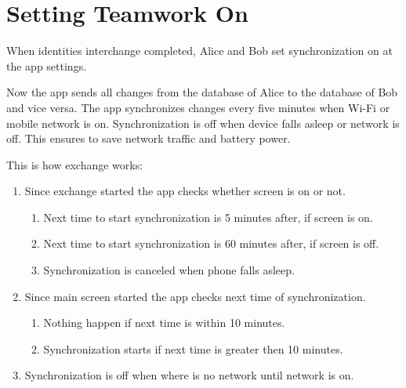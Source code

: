 \documentclass[a4paper,10pt,english]{sphinxmanual}
\begin{document}
\section{Setting Teamwork On}
\label{\detokenize{teamwork:setting-teamwork-on}}
When identities interchange completed, Alice and Bob set synchronization on at the app settings.

\noindent{}

\noindent{}

\noindent{}

\noindent{}

Now the app sends all changes from the database of Alice to the database of Bob and vice versa.
The app synchronizes changes every five minutes when Wi-Fi or mobile network is on. Synchronization
is off when device falls asleep or network is off. This ensures to save network traffic and
battery power.

This is how exchange works:
\begin{enumerate}
\def\theenumi{\arabic{enumi}}
\def\labelenumi{\theenumi .}
\makeatletter\def\p@enumii{\p@enumi \theenumi .}\makeatother
\item {} 
Since exchange started the app checks whether screen is on or not.
\begin{enumerate}
\def\theenumii{\arabic{enumii}}
\def\labelenumii{\theenumii .}
\makeatletter\def\p@enumiii{\p@enumii \theenumii .}\makeatother
\item {} 
Next time to start synchronization is 5 minutes after, if screen is on.

\item {} 
Next time to start synchronization is 60 minutes after, if screen is off.

\item {} 
Synchronization is canceled when phone falls asleep.

\end{enumerate}

\item {} 
Since main screen started the app checks next time of synchronization.
\begin{enumerate}
\def\theenumii{\arabic{enumii}}
\def\labelenumii{\theenumii .}
\makeatletter\def\p@enumiii{\p@enumii \theenumii .}\makeatother
\item {} 
Nothing happen if next time is within 10 minutes.

\item {} 
Synchronization starts if next time is greater then 10 minutes.

\end{enumerate}

\item {} 
Synchronization is off when where is no network until network is on.

\end{enumerate}
\end{document}
